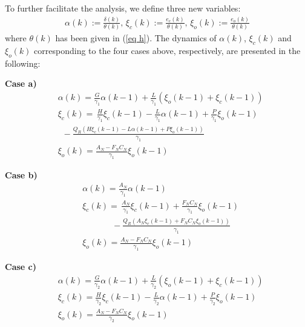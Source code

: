 \documentclass[letterpaper,journal,final,twocolumn]{IEEEtran}
\begin{document}
To further facilitate the analysis, we define three new variables:
\begin{align}\label{transformation}
\alpha(k) := \frac{\delta(k)}{\theta(k)},\,
\xi_c (k) := \frac{e_c(k)}{\theta(k)},\, \xi_o (k) := \frac{e_o(k)}{\theta(k)}
\end{align}
where $\theta(k)$ has been given in (\ref{eq h}). The dynamics of $\alpha(k)$, $\xi_c(k)$ and $\xi_o(k)$ corresponding to the four cases above, respectively, are presented in the following:







\textbf{Case a)} 
\begin{subequations}\label{case a 1}  
	\begin{align}
	&\alpha(k) = \frac{G}{\gamma_1} \alpha(k-1) +\frac{L}{\gamma_1}(\xi_o(k-1) + \xi_c(k-1)) \\
	&\xi_c(k) 
	=\, \frac{H}{\gamma_1} \xi_c(k-1) - \frac{L}{\gamma_1} \alpha (k-1) + \frac{P}{\gamma_1}\xi_o(k-1)   \nonumber\\ 
	&  \,\,\, -   \frac{Q_R \left(H \xi_c(k-1) - L\alpha(k-1) +  P\xi_o(k-1) \right)}{\gamma_1}\\
	&\xi_o(k) = \frac{A_N -  F_NC_N}{\gamma_1} \xi_o(k-1)
	\end{align}
\end{subequations}


\textbf{Case b)} 
\begin{subequations}\label{case b 1} 
	\begin{align}
	&\alpha(k) = \frac{A_N}{\gamma_1} \alpha(k-1)  \\
	&\xi_c(k) 
	=\,  \frac{A_N}{\gamma_1} \xi_c(k-1)  +  \frac{F_NC_N}{\gamma_1} \xi_o(k-1) \nonumber\\
	&\quad\quad \quad \,\,\,  -\frac{Q_R\left(   A_N \xi_c(k-1)  + F_NC_N \xi_o(k-1)  \right )}{\gamma_1} \\
	&\xi_o(k) = \frac{A_N - F_NC_N}{\gamma_1} \xi_o(k-1)
	\end{align}
\end{subequations}

\textbf{Case c)} 
\begin{subequations}\label{case c 1}  
	\begin{align}
	&\alpha(k) = \frac{G}{\gamma_2} \alpha(k-1) + \frac{L}{\gamma_2} (\xi_o(k-1) +\xi_c(k-1)) \\
	&\xi_c(k) =  \frac{H}{\gamma_2} \xi_c(k-1)  - \frac{L}{\gamma_2} \alpha(k-1) + \frac{P}{\gamma_2} \xi_o(k-1)\\
	&\xi_o(k)  = \frac{A_N-F_NC_N}{\gamma_2} \xi_o (k-1)
	\end{align}
\end{subequations}
\end{document}
